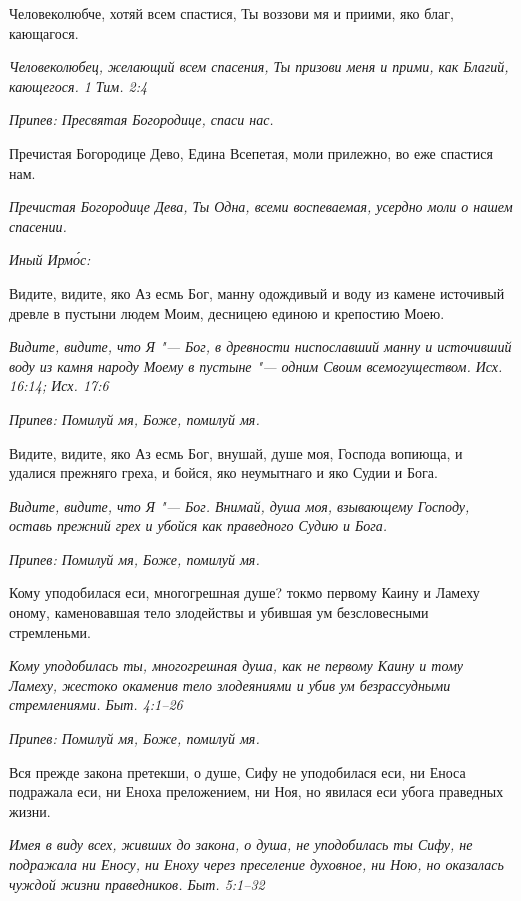 Человеколюбче, хотяй всем спастися, Ты воззови мя и приими, яко благ, кающагося.


\itshape Человеколюбец, желающий всем спасения, Ты призови меня и прими, как Благий, кающегося. 1 Тим. 2:4\normalfont{}


\itshape Припев:\normalfont{} Пресвятая Богородице, спаси нас.


Пречистая Богородице Дево, Едина Всепетая, моли прилежно, во еже спастися нам.


\itshape Пречистая Богородице Дева, Ты Одна, всеми воспеваемая, усердно моли о нашем спасении.\normalfont{}


\itshape Иный Ирмо́с:\normalfont{}


Видите, видите, яко Аз есмь Бог, манну одождивый и воду из камене источивый древле в пустыни людем Моим, десницею единою и крепостию Моею.


\itshape Видите, видите, что Я "--- Бог, в древности ниспославший манну и источивший воду из камня народу Моему в пустыне "--- одним Своим всемогуществом. Исх. 16:14; Исх. 17:6\normalfont{}


\itshape Припев:\normalfont{} Помилуй мя, Боже, помилуй мя.


Видите, видите, яко Аз есмь Бог, внушай, душе моя, Господа вопиюща, и удалися прежняго греха, и бойся, яко неумытнаго и яко Судии и Бога.


\itshape Видите, видите, что Я "--- Бог. Внимай, душа моя, взывающему Господу, оставь прежний грех и убойся как праведного Судию и Бога.\normalfont{}


\itshape Припев:\normalfont{} Помилуй мя, Боже, помилуй мя.


Кому уподобилася еси, многогрешная душе? токмо первому Каину и Ламеху оному, каменовавшая тело злодействы и убившая ум безсловесными стремленьми.


\itshape Кому уподобилась ты, многогрешная душа, как не первому Каину и тому Ламеху, жестоко окаменив тело злодеяниями и убив ум безрассудными стремлениями. Быт. 4:1–26\normalfont{}


\itshape Припев:\normalfont{} Помилуй мя, Боже, помилуй мя.


Вся прежде закона претекши, о душе, Сифу не уподобилася еси, ни Еноса подражала еси, ни Еноха преложением, ни Ноя, но явилася еси убога праведных жизни.


\itshape Имея в виду всех, живших до закона, о душа, не уподобилась ты Сифу, не подражала ни Еносу, ни Еноху через преселение духовное, ни Ною, но оказалась чуждой жизни праведников. Быт. 5:1–32\normalfont{}



